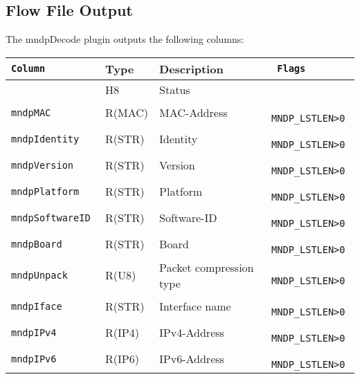 \documentclass[documentation]{subfiles}
\begin{document}
\subsection{Flow File Output}
The mndpDecode plugin outputs the following columns:
\begin{longtable}{>{\tt}lll>{\tt\small}l}
    \toprule
    {\bf Column}       & {\bf Type} & {\bf Description}       & {\bf Flags}\\
    \midrule\endhead%
    \nameref{mndpStat} & H8         & Status                  & \\
    mndpMAC            & R(MAC)     & MAC-Address             & MNDP\_LSTLEN>0\\
    mndpIdentity       & R(STR)     & Identity                & MNDP\_LSTLEN>0\\
    mndpVersion        & R(STR)     & Version                 & MNDP\_LSTLEN>0\\
    mndpPlatform       & R(STR)     & Platform                & MNDP\_LSTLEN>0\\
    mndpSoftwareID     & R(STR)     & Software-ID             & MNDP\_LSTLEN>0\\
    mndpBoard          & R(STR)     & Board                   & MNDP\_LSTLEN>0\\
    mndpUnpack         & R(U8)      & Packet compression type & MNDP\_LSTLEN>0\\
    mndpIface          & R(STR)     & Interface name          & MNDP\_LSTLEN>0\\
    mndpIPv4           & R(IP4)     & IPv4-Address            & MNDP\_LSTLEN>0\\
    mndpIPv6           & R(IP6)     & IPv6-Address            & MNDP\_LSTLEN>0\\
    \bottomrule
\end{longtable}
\end{document}
